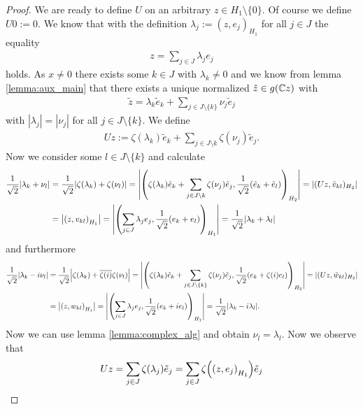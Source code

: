 \begin{proof}
	We are ready to define $U$ on an arbitrary $z \in H_1 \setminus \{0\}$. Of course we define $U0 := 0$.  We know that with the definition $\lambda_j := (z,e_j)_{H_1}$ for all $j \in J$ the equality
	\begin{align*}
		z = \sum_{j \in J} \lambda_j e_j
	\end{align*}
	holds. As $x \neq 0$ there exists some $k \in J$ with $\lambda_k \neq 0$ and we know from lemma \ref{lemma:aux_main} that there exists a unique normalized $\tilde{z} \in g(\mathbb{C} z)$ with
	\begin{align*}
		\tilde{z} = \lambda_k \tilde{e}_k + \sum_{j \in J \setminus \{k\}} \nu_j \tilde{e}_j
	\end{align*} 
	with $|\lambda_j| = |\nu_j|$ for all $j \in J \setminus \{k\}$. We define
	\begin{align*}
		Uz := \zeta(\lambda_k) \tilde{e}_k + \sum_{j \in J \setminus{k}} \zeta(\nu_j) \tilde{e}_j.
	\end{align*}
	Now we consider some $l \in J \setminus \{k\}$ and calculate
	\begin{align*}
		\frac{1}{\sqrt{2}}{\left | \lambda_k + \nu_l \right |} &= \frac{1}{\sqrt{2}} {\left | \zeta(\lambda_k) + \zeta(\nu_l) \right |} = {\left | {\left ( \zeta(\lambda_k) \tilde{e}_k + \sum_{j \in J \setminus{k}} \zeta(\nu_j) \tilde{e}_j, \frac{1}{\sqrt{2}}(\tilde{e}_k + \tilde{e}_l) \right )}_{H_2} \right |} = |(Uz, \tilde{v}_{kl})_{H_2}| \\
		&= {\left | {\left ( z, v_{kl} \right )}_{H_1} \right |} = {\left | {\left ( \sum_{j \in J} \lambda_j e_j, \frac{1}{\sqrt{2}}(e_k + e_l) \right )}_{H_1} \right |} = \frac{1}{\sqrt{2}} {\left | \lambda_k + \lambda_l \right |} 
	\end{align*}
	and furthermore
	\begin{align*}
		\frac{1}{\sqrt{2}}{\left | \lambda_k - i \nu_l \right |} &= \frac{1}{\sqrt{2}} {\left | \zeta(\lambda_k) + \overline{\zeta(i)} \zeta(\nu_l) \right |} = {\left | {\left ( \zeta(\lambda_k) \tilde{e}_k + \sum_{j \in J \setminus \{k\}} \zeta(\nu_j) \tilde{e}_j, \frac{1}{\sqrt{2}}(e_k + \zeta(i) e_l) \right )}_{H_2} \right |} = |(Uz, \tilde{w}_{kl})_{H_2}| \\
		&= {\left | {\left ( z, w_{kl} \right )}_{H_1} \right |} = {\left | {\left ( \sum_{j \in J} \lambda_j e_j, \frac{1}{\sqrt{2}}(e_k + ie_l) \right )}_{H_1} \right |} = \frac{1}{\sqrt{2}} {\left | \lambda_k - i \lambda_l \right |}.
	\end{align*}
	Now we can use lemma \ref{lemma:complex_alg} and obtain $\nu_l = \lambda_l$. Now we observe that 
	\begin{align*}
		Uz = \sum_{j \in J} \zeta(\lambda_j) \tilde{e}_j = \sum_{j \in J} \zeta\pbraces{\pbraces{z, e_j}_{H_1}}\tilde{e}_j

\end{align*}
\end{proof}

